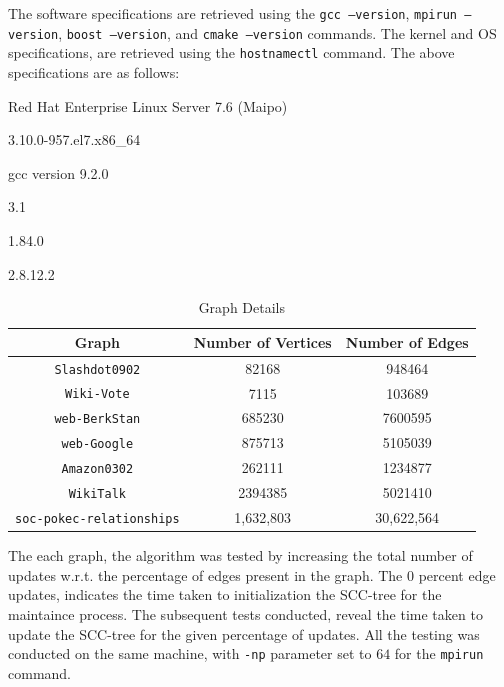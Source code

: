 The software specifications are retrieved using the \texttt{gcc --version}, \texttt{mpirun --version}, \texttt{boost --version}, and \texttt{cmake --version} commands.
The kernel and OS specifications, are retrieved using the \texttt{hostnamectl} command. The above specifications are as follows:
\begin{description}[font=\sffamily\bfseries\small,itemsep=0pt,parsep=0pt]
    \item[Operating System:] Red Hat Enterprise Linux Server 7.6 (Maipo)
    \item[Kernel:] 3.10.0-957.el7.x86\_64
    \item[Compiler:] gcc version 9.2.0
    \item[OpenMPI:] 3.1
    \item[Boost:] 1.84.0
    \item[CMake:] 2.8.12.2
\end{description}

\begin{table}[H]
    \centering
    \caption{Graph Details \cite[SNAP Datasets]{snapnets}}
    \begin{tabular}{|c|c|c|}
        \hline
        \textbf{Graph} & \textbf{Number of Vertices} & \textbf{Number of Edges} \\
        \hline
        \texttt{Slashdot0902} & 82168 & 948464 \\
        \texttt{Wiki-Vote} & 7115 & 103689 \\
        \texttt{web-BerkStan} & 685230 & 7600595 \\
        \texttt{web-Google} & 875713 & 5105039 \\
        \texttt{Amazon0302} & 262111 & 1234877 \\
        \texttt{WikiTalk} & 2394385 & 5021410 \\
        \texttt{soc-pokec-relationships} & 1,632,803 & 30,622,564 \\
        \hline
    \end{tabular}
    \label{tab:graph_details}
\end{table}

The each graph, the algorithm was tested by increasing the total number of updates w.r.t. the percentage of edges present in the graph. 
The $0$ percent edge updates, indicates the time taken to initialization the SCC-tree for the maintaince process. 
The subsequent tests conducted, reveal the time taken to update the SCC-tree for the given percentage of updates. 
All the testing was conducted on the same machine, with \texttt{-np} parameter set to $64$ for the \texttt{mpirun} command.


